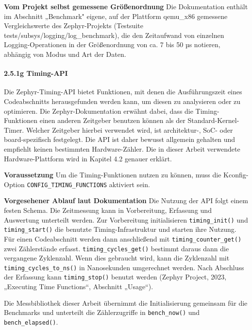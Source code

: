 \textbf{Vom Projekt selbst gemessene Größenordnung} Die Dokumentation enthält im Abschnitt „Benchmark" eigene, auf der Plattform qemu\_x86 gemessene Vergleichswerte des Zephyr-Projekts (Testsuite tests/subsys/logging/log\_benchmark), die den Zeitaufwand von einzelnen Logging-Operationen in der Größenordnung von ca. 7 bis 50 µs notieren, abhängig von Modus und Art der Daten.

\paragraph*{\textbf{2.5.1g Timing-API}}
Die Zephyr-Timing-API bietet Funktionen, mit denen die Ausführungszeit eines Codeabschnitts herausgefunden werden kann, um diesen zu analysieren oder zu optimieren. Die Zephyr-Dokumentation erwähnt dabei, dass die Timing-Funktionen einen anderen Zeitgeber benutzen können als der Standard-Kernel-Timer. Welcher Zeitgeber hierbei verwendet wird, ist architektur-, SoC- oder board-spezifisch festgelegt. Die API ist daher bewusst allgemein gehalten und empfiehlt keinen bestimmten Hardware-Zähler. Die in dieser Arbeit verwendete Hardware-Plattform wird in Kapitel 4.2 genauer erklärt.

\textbf{Voraussetzung} Um die Timing-Funktionen nutzen zu können, muss die Kconfig-Option \lstinline[style=fileinline]|CONFIG_TIMING_FUNCTIONS| aktiviert sein.

\textbf{Vorgesehener Ablauf laut Dokumentation} Die Nutzung der API folgt einem festen Schema. Die Zeitmessung kann in Vorbereitung, Erfassung und Auswertung unterteilt werden. Zur Vorbereitung initialisieren \lstinline[style=fileinline]|timing_init()| und \lstinline[style=fileinline]|timing_start()| die benutzte Timing-Infrastruktur und starten ihre Nutzung. Für einen Codeabschnitt werden dann anschließend mit \lstinline[style=fileinline]|timing_counter_get()| zwei Zählerstände erfasst. \lstinline[style=fileinline]|timing_cycles_get()| bestimmt daraus dann die vergangene Zyklenzahl. Wenn dies gebraucht wird, kann die Zyklenzahl mit \lstinline[style=fileinline]|timing_cycles_to_ns()| in Nanosekunden umgerechnet werden. Nach Abschluss der Erfassung kann \lstinline[style=fileinline]|timing_stop()| benutzt werden (Zephyr Project, 2023, „Executing Time Functions“, Abschnitt „Usage“).

Die Messbibliothek dieser Arbeit übernimmt die Initialisierung gemeinsam für die Benchmarks und unterteilt die Zählerzugriffe in \lstinline[style=fileinline]|bench_now()| und \lstinline[style=fileinline]|bench_elapsed()|.

